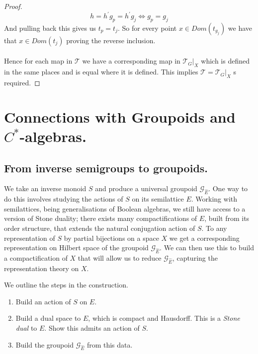 \documentclass[11pt]{amsart}
\theoremstyle{plain}
\theoremstyle{definition}%
\theoremstyle{remark}%
\newcommand{\G}{\mathcal{G}}
\newcommand{\E}{\widehat{E}}
\begin{document}
\begin{proof}
\begin{equation}
h=h^{'}g_{p}=h^{'}g_{j} \Leftrightarrow g_{p}=g_{j}
\end{equation}
And pulling back this gives us $t_{p}=t_{j}$. So for every point $x\in Dom(t_{g_{j}})$ we have that $x \in Dom(t_{j})$ proving the reverse inclusion.\\
\\
Hence for each map in $\mathcal{T}$ we have a corresponding map in $\mathcal{T}_{G}|_{X}$ which is defined in the same places and is equal where it is defined. This implies $\mathcal{T}=\mathcal{T}_{G}|_{X}$ s required.
\end{proof}

\section{Connections with Groupoids and $C^{*}$-algebras.}

\subsection{From inverse semigroups to groupoids.}
We take an inverse monoid $S$ and produce a universal groupoid $\G_{\E}$. One way to do this involves studying the actions of $S$ on its semilattice $E$. Working with semilattices, being generalisations of Boolean algebras, we still have access to a version of Stone duality; there exists many compactifications of $E$, built from its order structure, that extends the natural conjugation action of $S$. To any representation of $S$  by partial bijections on a space $X$ we get a corresponding representation on Hilbert space of the groupoid $\G_{\E}$. We can then use this to build a compactification of $X$ that will allow us to reduce $\G_{\E}$, capturing the representation theory on $X$.

We outline the steps in the construction.
\begin{enumerate}
\item Build an action of $S$ on $E$.
\item Build a dual space to $E$, which is compact and Hausdorff. This is a \textit{Stone dual} to $E$. Show this admits an action of $S$.
\item Build the groupoid $\G_{\E}$ from this data.
\end{enumerate}
\end{document}
